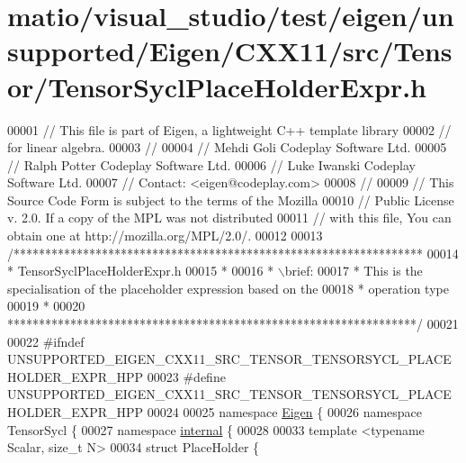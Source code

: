 \hypertarget{matio_2visual__studio_2test_2eigen_2unsupported_2_eigen_2_c_x_x11_2src_2_tensor_2_tensor_sycl_place_holder_expr_8h_source}{}\section{matio/visual\+\_\+studio/test/eigen/unsupported/\+Eigen/\+C\+X\+X11/src/\+Tensor/\+Tensor\+Sycl\+Place\+Holder\+Expr.h}
\label{matio_2visual__studio_2test_2eigen_2unsupported_2_eigen_2_c_x_x11_2src_2_tensor_2_tensor_sycl_place_holder_expr_8h_source}

\begin{DoxyCode}
00001 \textcolor{comment}{// This file is part of Eigen, a lightweight C++ template library}
00002 \textcolor{comment}{// for linear algebra.}
00003 \textcolor{comment}{//}
00004 \textcolor{comment}{// Mehdi Goli    Codeplay Software Ltd.}
00005 \textcolor{comment}{// Ralph Potter  Codeplay Software Ltd.}
00006 \textcolor{comment}{// Luke Iwanski  Codeplay Software Ltd.}
00007 \textcolor{comment}{// Contact: <eigen@codeplay.com>}
00008 \textcolor{comment}{//}
00009 \textcolor{comment}{// This Source Code Form is subject to the terms of the Mozilla}
00010 \textcolor{comment}{// Public License v. 2.0. If a copy of the MPL was not distributed}
00011 \textcolor{comment}{// with this file, You can obtain one at http://mozilla.org/MPL/2.0/.}
00012 
00013 \textcolor{comment}{/*****************************************************************}
00014 \textcolor{comment}{ * TensorSyclPlaceHolderExpr.h}
00015 \textcolor{comment}{ *}
00016 \textcolor{comment}{ * \(\backslash\)brief:}
00017 \textcolor{comment}{ *  This is the specialisation of the placeholder expression based on the}
00018 \textcolor{comment}{ * operation type}
00019 \textcolor{comment}{ *}
00020 \textcolor{comment}{*****************************************************************/}
00021 
00022 \textcolor{preprocessor}{#ifndef UNSUPPORTED\_EIGEN\_CXX11\_SRC\_TENSOR\_TENSORSYCL\_PLACEHOLDER\_EXPR\_HPP}
00023 \textcolor{preprocessor}{#define UNSUPPORTED\_EIGEN\_CXX11\_SRC\_TENSOR\_TENSORSYCL\_PLACEHOLDER\_EXPR\_HPP}
00024 
00025 \textcolor{keyword}{namespace }\hyperlink{namespace_eigen}{Eigen} \{
00026 \textcolor{keyword}{namespace }TensorSycl \{
00027 \textcolor{keyword}{namespace }\hyperlink{namespaceinternal}{internal} \{
00028 
00033 \textcolor{keyword}{template} <\textcolor{keyword}{typename} Scalar, \textcolor{keywordtype}{size\_t} N>
00034 \textcolor{keyword}{struct }PlaceHolder \{

\end{DoxyCode}
